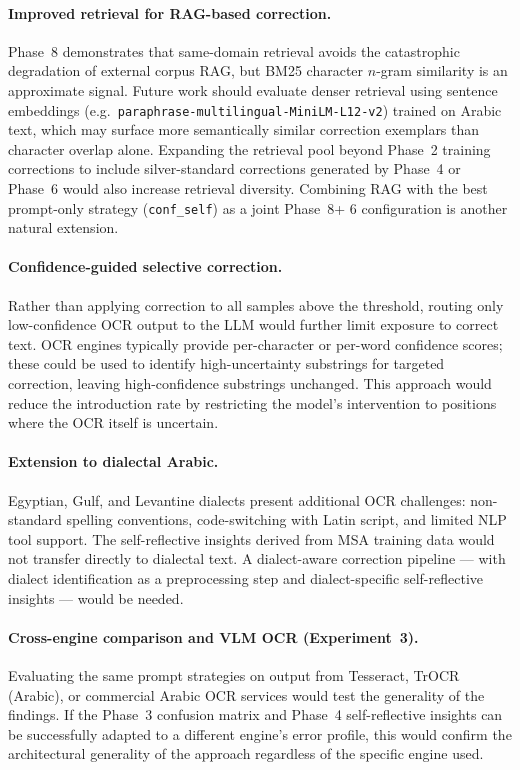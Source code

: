 \paragraph{Improved retrieval for RAG-based correction.}
Phase~8 demonstrates that same-domain retrieval avoids the catastrophic
degradation of external corpus RAG, but BM25 character $n$-gram similarity
is an approximate signal. Future work should evaluate denser retrieval
using sentence embeddings (e.g.\ \texttt{paraphrase-multilingual-MiniLM-L12-v2})
trained on Arabic text, which may surface more semantically similar correction
exemplars than character overlap alone. Expanding the retrieval pool beyond
Phase~2 training corrections to include silver-standard corrections generated
by Phase~4 or Phase~6 would also increase retrieval diversity. Combining RAG
with the best prompt-only strategy (\texttt{conf\_self}) as a joint Phase~8+
6 configuration is another natural extension.

\paragraph{Confidence-guided selective correction.}
Rather than applying correction to all samples above the threshold, routing
only low-confidence OCR output to the LLM would further limit exposure to
correct text. OCR engines typically provide per-character or per-word
confidence scores; these could be used to identify high-uncertainty substrings
for targeted correction, leaving high-confidence substrings unchanged.
This approach would reduce the introduction rate by restricting the model's
intervention to positions where the OCR itself is uncertain.

\paragraph{Extension to dialectal Arabic.}
Egyptian, Gulf, and Levantine dialects present additional OCR challenges:
non-standard spelling conventions, code-switching with Latin script, and
limited NLP tool support. The self-reflective insights derived from MSA
training data would not transfer directly to dialectal text. A dialect-aware
correction pipeline --- with dialect identification as a preprocessing step
and dialect-specific self-reflective insights --- would be needed.

\paragraph{Cross-engine comparison and VLM OCR (Experiment~3).}
Evaluating the same prompt strategies on output from Tesseract, TrOCR (Arabic),
or commercial Arabic OCR services would test the generality of the findings.
If the Phase~3 confusion matrix and Phase~4 self-reflective insights can be
successfully adapted to a different engine's error profile, this would
confirm the architectural generality of the approach regardless of the specific
engine used.

